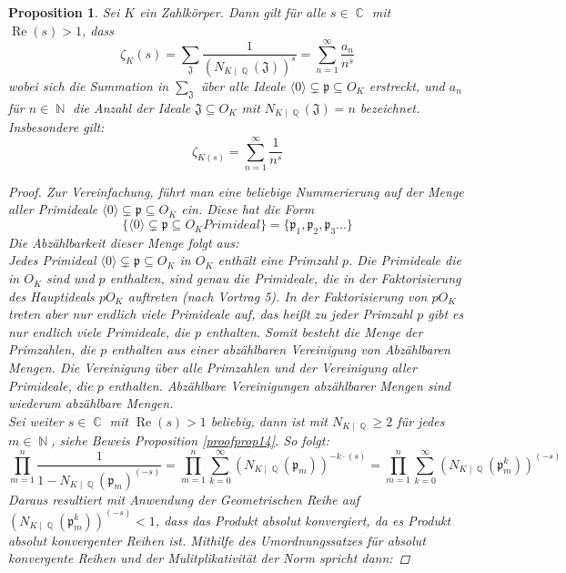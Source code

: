 \documentclass[10pt,a4paper]{article}
\theoremstyle{plain}
\newtheorem{prop}[thm]{Proposition}
\theoremstyle{definition}
\theoremstyle{remark}
\DeclareMathOperator{\C}{\mathbb{C}}
\DeclareMathOperator{\Q}{\mathbb{Q}}
\DeclareMathOperator{\N}{\mathbb{N}}
\DeclareMathOperator{\re}{Re}
\begin{document}
\begin{prop}

Sei $\textit{K}$ ein Zahlkörper. Dann gilt für alle $s \in \C $ mit $ \re(s)>1$, dass$$\zeta_{K}(s) = \sum_{\mathfrak{J}}\frac{1}{(N_{K\mid\Q}(\mathfrak{J}))^s}=\sum_{n=1}^{\infty}\frac{a_n}{n^s}$$
wobei sich die Summation in $\sum_{\mathfrak{J}}$ über alle Ideale $\langle0\rangle\subsetneq \mathfrak{p} \subseteq O_{\textit{K}}$ erstreckt, und $a_n$ für $n \in \N$ die Anzahl der Ideale $\mathfrak{J} \subseteq O_K$ mit $N_{K\mid \Q}(\mathfrak{J}) = n$ bezeichnet. Insbesondere gilt: $$\zeta_{K(s)}= \sum_{n=1}^{\infty}\frac{1}{n^s}$$

\begin{proof}

Zur Vereinfachung, führt man eine beliebige Nummerierung auf der Menge aller Primideale $\langle0\rangle\subsetneq \mathfrak{p} \subseteq O_{\textit{K}}$ ein. Diese hat die Form $$\{\langle0\rangle\subsetneq \mathfrak{p} \subseteq O_{\textit{K}} Primideal \}=\{\mathfrak{p}_1,\mathfrak{p}_2,\mathfrak{p}_3...\}$$Die Abzählbarkeit dieser Menge folgt aus: 
\\
Jedes Primideal $\langle0\rangle\subsetneq \mathfrak{p} \subseteq O_{K}$ in $O_K$ enthält eine Primzahl $p$. Die Primideale die in $O_K$ sind und $p$ enthalten, sind genau die Primideale, die in der Faktorisierung des Hauptideals $pO_K$ auftreten (nach Vortrag 5). In der Faktorisierung von $pO_K$ treten aber nur endlich viele Primideale auf, das heißt zu jeder Primzahl $p$ gibt es nur endlich viele Primideale, die $p$ enthalten. Somit besteht die Menge der Primzahlen, die $p$ enthalten aus einer abzählbaren Vereinigung von Abzählbaren Mengen. Die Vereinigung über alle Primzahlen und der Vereinigung aller Primideale, die $p$ enthalten. Abzählbare Vereinigungen abzählbarer Mengen sind wiederum abzählbare Mengen.
\\
Sei weiter $s \in \C $ mit $ \re(s) > 1$ beliebig, dann ist mit $N_{K\mid \Q}\geq 2$ für jedes $m \in \N$,  siehe Beweis Proposition \ref{proofprop14}. So folgt:$$\prod_{m=1}^{n}\frac{1}{1-N_{K\mid \Q}(\mathfrak{p}_m)^{(-s)}} =\prod_{m=1}^{n}\sum_{k=0}^{\infty}(N_{K\mid \Q}(\mathfrak{p}_m))^{-k\cdot(s)}=\prod_{m=1}^{n}\sum_{k=0}^{\infty}(N_{K\mid \Q}(\mathfrak{p}_m^k))^{(-s)}$$
Daraus resultiert mit Anwendung der Geometrischen Reihe auf \\
$(N_{K\mid \Q}(\mathfrak{p}_m^k))^{(-s)} < 1$, dass das Produkt absolut konvergiert, da es Produkt absolut konvergenter Reihen ist. Mithilfe des Umordnungssatzes für absolut konvergente Reihen und der Mulitplikativität der Norm spricht dann:

\end{proof}
\end{prop}
\end{document}
